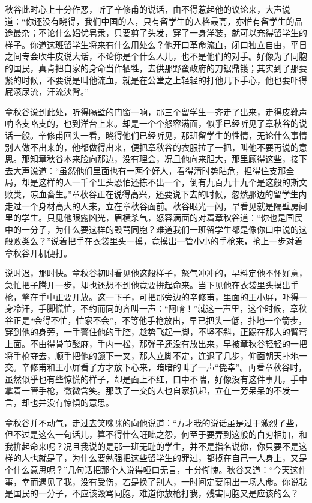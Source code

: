 \documentclass[12pt,UTF8]{ctexbook}
\begin{document}
{{{秋谷此时心上十分作恶，听了辛修甫的说话，由不得惹起他的议论来，大声说道：“你还没有晓得，我们中国的人，只有留学生的人格最高，亦惟有留学生的品途最杂；不论什么娼优皂隶，只要剪了头发，穿了一身洋装，就可以充得留学生的样子。你道这班留学生将来有什么用处么？他开口革命流血，闭口独立自由，平日之间专会吹牛皮说大话，不论你是个什么人儿，也不是他们的对手。好像为了同胞的国民，真肯把自家的身命当作牺牲，去供那野蛮政府的刀锯鼎镬；其实到了那要紧的时候，不要说是叫他流血，就是在公堂之上轻轻的打他几下手心，他也要吓得屁滚尿流，汗流浃背。”

章秋谷说到此处，听得隔壁的门窗一响，那三个留学生一齐走了出来，走得皮靴声响咯支咯支的，也到洋台上来。却是一个个怒容满面，似乎已经听见了章秋谷的说话一般。辛修甫回头一看，晓得他们已经听见，那班留学生的性情，无论什么事情别人做不出来的，他都做得出来，便把章秋谷的衣服拉了一把，叫他不要再说的意思。那知章秋谷本来脸向那边，没有理会，况且他向来胆大，那里顾得这些，接下去大声说道：“虽然他们里面也有一两个好人，看得清时势阽危，担得住支那全局，却是这样的人一千个里头恐怕还拣不出一个，倒有九百九十九个是这般的斯文败类，凉血畜生。”章秋谷正在说得高兴，还要说下去的时候，忽然那边的留学生内走过一个身材高大的人来，立在章秋谷面前。秋谷眼光一闪，早看见就是隔壁房间里的学生。只见他眼露凶光，眉横杀气，怒容满面的对着章秋谷道：“你也是国民中的一分子，为什么要这样的毁骂同胞？难道我们一班留学生都是像你口中说的这般败类么？”说着把手在衣袋里头一摸，竟摸出一管小小的手枪来，抢上一步对着章秋谷开机便打。

说时迟，那时快。章秋谷初时看见他这般样子，怒气冲冲的，早料定他不怀好意，急忙把子腾开一步，却也还想不到他竟要拚起命来。当下见他在衣袋里头摸出手枪，擎在手中正要开放。这一下子，可把那旁边的辛修甫，里面的王小屏，吓得一身冷汗，手脚慌忙，不约而同的齐叫一声：“阿唷！”就这一声里，这个时候，章秋谷正是“会得不忙，忙家不会”，不等他手枪放出，早已把头一低，扑地一个箭步，穿到他的身旁，一手警住他的手腔，趁势飞起一脚，不竖不斜，正踢在那人的臂弯上面。不由得骨节酸麻，手内一松，那弹子还没有放出来，早被章秋谷轻轻的一把将手枪夺去，顺手把他的颔下一叉，那人立脚不定，连退了几步，仰面朝天扑地一交。辛修甫和王小屏看了方才放下心来，暗暗的叫了一声“侥幸”。再看章秋谷时，虽然似乎也有些惊慌的样子，却是面上不红，口中不喘，好像没有这件事儿，手中拿着一管手枪，微微含笑。那跌了一交的人也自家扒起，立在一旁呆呆的不发一言，却也并没有惊惧的意思。

章秋谷并不动气，走过去笑咪咪的向他说道：“方才我的说话虽是过于激烈了些，但不过是这么一句话儿，算不得什么睚眦之怨，何至于要弄到这般的白刃相加，和我拚起命来呢？况且我说的是那一班无耻的学生，并不是指名说你，你只要不是这样的人也就是了，为什么要勉强把这些留学生的罪过，都揽在自己一人身上，又是个什么意思呢？”几句话把那个人说得哑口无言，十分惭愧。秋谷又道：“今天这件事，幸而遇见了我，没有受伤，若是换了别人，一时间定要闹出一场人命。你说我是国民的一分子，不应该毁骂同胞，难道你放枪打我，残害同胞又是应该的么？

}}}
\end{document}
